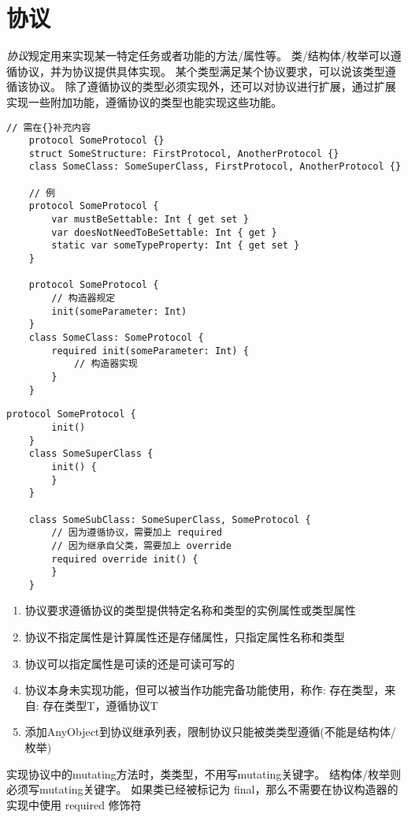 \documentclass{../main.tex}{subfiles}
\begin{document}
\section{协议}
\emph{协议}规定用来实现某一特定任务或者功能的方法/属性等。
类/结构体/枚举可以遵循协议，并为协议提供具体实现。
某个类型满足某个协议要求，可以说该类型遵循该协议。
除了遵循协议的类型必须实现外，还可以对协议进行扩展，通过扩展实现一些附加功能，遵循协议的类型也能实现这些功能。
\begin{lstlisting}[style = lstCodeStyleSwift, title = {协议基本框架与示例}]
    // 需在{}补充内容
    protocol SomeProtocol {}
    struct SomeStructure: FirstProtocol, AnotherProtocol {}
    class SomeClass: SomeSuperClass, FirstProtocol, AnotherProtocol {}

    // 例
    protocol SomeProtocol {
        var mustBeSettable: Int { get set }
        var doesNotNeedToBeSettable: Int { get }
        static var someTypeProperty: Int { get set }
    }

    protocol SomeProtocol {
        // 构造器规定
        init(someParameter: Int)
    }
    class SomeClass: SomeProtocol {
        required init(someParameter: Int) {
            // 构造器实现
        }
    }
\end{lstlisting}

\begin{lstlisting}[style = lstCodeStyleSwift, title = {协议构造器+子类重写父类}]
    protocol SomeProtocol {
        init()
    }
    class SomeSuperClass {
        init() {
        }
    }

    class SomeSubClass: SomeSuperClass, SomeProtocol {
        // 因为遵循协议，需要加上 required
        // 因为继承自父类，需要加上 override
        required override init() {
        }
    }
\end{lstlisting}

\begin{enumerate}[itemsep=0pt, parsep=0pt, topsep=0pt, partopsep=0pt]
  \item 协议要求遵循协议的类型提供特定名称和类型的实例属性或类型属性
  \item 协议不指定属性是计算属性还是存储属性，只指定属性名称和类型
  \item 协议可以指定属性是可读的还是可读可写的
  \item 协议本身未实现功能，但可以被当作功能完备功能使用，称作: 存在类型，来自: 存在类型T，遵循协议T
  \item 添加AnyObject到协议继承列表，限制协议只能被类类型遵循(不能是结构体/枚举)
\end{enumerate}
\begin{artCaution}
  实现协议中的mutating方法时，类类型，不用写mutating关键字。
  结构体/枚举则必须写mutating关键字。
  如果类已经被标记为 final，那么不需要在协议构造器的实现中使用 required 修饰符
\end{artCaution}


\end{document}
